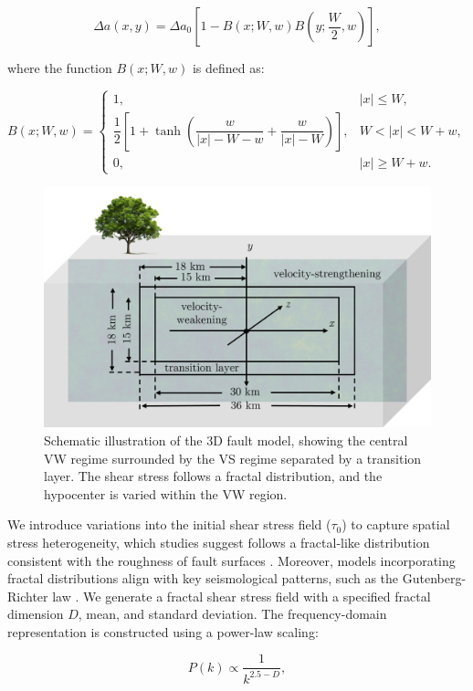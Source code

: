 \documentclass[draft]{agujournal2019}
\begin{document}
\begin{equation}
\Delta a(x, y) = \Delta a_0 \left[ 1 - B(x; W, w) B\left(y; \frac{W}{2}, w\right) \right],
\end{equation}

where the function \(B(x; W, w)\) is defined as:

\begin{equation}
B(x; W, w) =
\begin{cases}
1, & |x| \leq W, \\
\dfrac{1}{2} \left[ 1 + \tanh\left( \dfrac{w}{|x| - W - w} + \dfrac{w}{|x| - W} \right) \right], & W < |x| < W + w, \\
0, & |x| \geq W + w.
\end{cases}
\end{equation}


\begin{figure}
\centering
\includegraphics[width=0.5\linewidth]{fault_model.png}
\caption{\label{fig:schematic_fault}Schematic illustration of the 3D fault model, showing the central VW regime surrounded by the VS regime separated by a transition layer. The shear stress follows a fractal distribution, and the hypocenter is varied within the VW region.
}
\end{figure}

We introduce variations into the initial shear stress field (\(\tau_{0}\)) to capture spatial stress heterogeneity, which studies suggest follows a fractal-like distribution consistent with the roughness of fault surfaces \cite{andrews1980stochastic,renard2017scaling}. Moreover, models incorporating fractal distributions align with key seismological patterns, such as the Gutenberg-Richter law \cite{hirata1989correlation}. We generate a fractal shear stress field with a specified fractal dimension \(D\), mean, and standard deviation. The frequency-domain representation is constructed using a power-law scaling:

\begin{equation}
P(k) \propto \frac{1}{k^{2.5-D}},
\label{eq:amp}
\end{equation}
\end{document}
